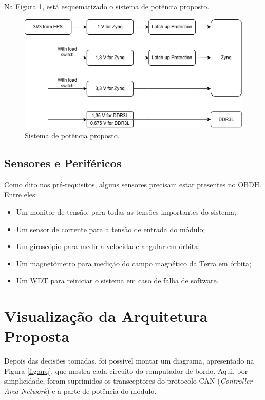 Na Figura \ref{fig:diapower}, está esquematizado o sistema de potência proposto.

\begin{figure}[H]
    \centering
    \includegraphics[scale=0.8]{images/diapower.png}
    \caption{Sistema de potência proposto.}
    \label{fig:diapower}
\end{figure}

\subsection{Sensores e Periféricos}
Como dito nos pré-requisitos, alguns sensores precisam estar presentes no OBDH. Entre eles:

\begin{itemize}
	\item Um monitor de tensão, para todas as tensões importantes do sistema;
	\item Um sensor de corrente para a tensão de entrada do módulo;
	\item Um giroscópio para medir a velocidade angular em órbita;
	\item Um magnetômetro para medição do campo magnético da Terra em órbita;
	\item Um WDT para reiniciar o sistema em caso de falha de software.
\end{itemize}

\section{Visualização da Arquitetura Proposta}

Depois das decisões tomadas, foi possível montar um diagrama, apresentado na Figura \ref{fig:arq}, que mostra cada circuito do computador de bordo. Aqui, por simplicidade, foram suprimidos os transceptores do protocolo CAN (\textit{Controller Area Network}) e a parte de potência do módulo. 


